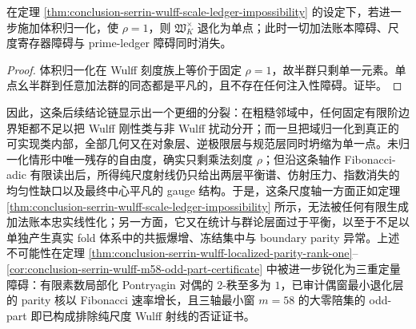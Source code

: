 \begin{corollary}[体积归一化是同态障碍的精确切断]\label{cor:conclusion-serrin-wulff-volume-normalization-cuts-ledger-obstruction}
在定理 \ref{thm:conclusion-serrin-wulff-scale-ledger-impossibility} 的设定下，若进一步施加体积归一化，使 \(\rho=1\)，则 \(\mathfrak W_K^{\times}\) 退化为单点；此时一切加法账本障碍、尺度寄存器障碍与 prime-ledger 障碍同时消失。
\end{corollary}
\begin{proof}
体积归一化在 Wulff 刻度族上等价于固定 \(\rho=1\)，故半群只剩单一元素。单点幺半群到任意加法群的同态都是平凡的，且不存在任何注入性障碍。证毕。
\end{proof}





\noindent
因此，这条后续结论链显示出一个更细的分裂：在粗糙邻域中，任何固定有限阶边界矩都不足以把 Wulff 刚性类与非 Wulff 扰动分开；而一旦把域归一化到真正的可实现类内部，全部几何又在对象层、逆极限层与规范层同时坍缩为单一点。未归一化情形中唯一残存的自由度，确实只剩乘法刻度 \(\rho\)；但沿这条轴作 Fibonacci-adic 有限读出后，所得纯尺度射线仍只给出两层平衡谱、仿射压力、指数消失的均匀性缺口以及最终中心平凡的 gauge 结构。于是，这条尺度轴一方面正如定理 \ref{thm:conclusion-serrin-wulff-scale-ledger-impossibility} 所示，无法被任何有限生成加法账本忠实线性化；另一方面，它又在统计与群论层面过于平衡，以至于不足以单独产生真实 fold 体系中的共振爆增、冻结集中与 boundary parity 异常。上述不可能性在定理 \ref{thm:conclusion-serrin-wulff-localized-parity-rank-one}--\ref{cor:conclusion-serrin-wulff-m58-odd-part-certificate} 中被进一步锐化为三重定量障碍：有限素数局部化 Pontryagin 对偶的 \(2\)-秩至多为 \(1\)，已审计偶窗最小退化层的 parity 核以 Fibonacci 速率增长，且三轴最小窗 \(m=58\) 的大零陪集的 odd-part 即已构成排除纯尺度 Wulff 射线的否证证书。

\endinput
